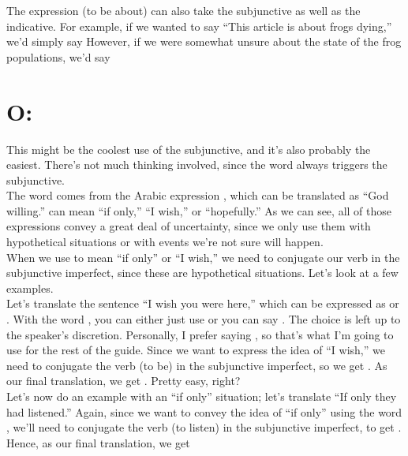 The expression  (to be about) can also take the subjunctive as well as the indicative. For example, if we wanted to say ``This article is about frogs dying,'' we'd simply say  However, if we were somewhat unsure about the state of the frog populations, we'd say 

\section{O: }

This might be the coolest use of the subjunctive, and it's also probably the easiest. There's not much thinking involved, since the word  always triggers the subjunctive. \\

The word  comes from the Arabic expression , which can be translated as ``God willing.''  can mean ``if only,'' ``I wish,'' or ``hopefully.'' As we can see, all of those expressions convey a great deal of uncertainty, since we only use them with hypothetical situations or with events we're not sure will happen.\\

When we use  to mean ``if only'' or ``I wish,'' we need to conjugate our verb in the subjunctive imperfect, since these are hypothetical situations. Let's look at a few examples. \\

Let's translate the sentence ``I wish you were here,'' which can be expressed as  or . With the word , you can either just use  or you can say . The choice is left up to the speaker's discretion. Personally, I prefer saying , so that's what I'm going to use for the rest of the guide. Since we want to express the idea of ``I wish,'' we need to conjugate the verb  (to be) in the subjunctive imperfect, so we get . As our final translation, we get . Pretty easy, right? \\

Let's now do an example with an ``if only'' situation; let's translate ``If only they had listened.'' Again, since we want to convey the idea of ``if only'' using the word , we'll need to conjugate the verb  (to listen) in the subjunctive imperfect, to get . Hence, as our final translation, we get  \\

